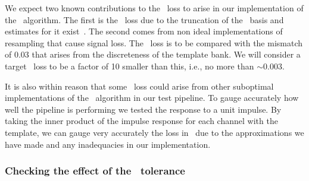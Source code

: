 We expect two known contributions to the \SNR\ loss to arise in our
implementation of the \lloid\ algorithm.  The first is the \SNR\ loss due to
the truncation of the \SVD\ basis and estimates for it
exist~\cite{Cannon:2010p10398}.  The second comes from non ideal
implementations of resampling that cause signal loss.  The \SNR\ loss is to be
compared with the mismatch of 0.03 that arises from the discreteness of the
template bank.  We will consider a target \SNR\ loss to be a factor of 10
smaller than this, i.e., no more than $\sim$0.003.

It is also within reason that some \SNR\ loss could arise from other suboptimal
implementations of the \lloid\ algorithm in our test pipeline.  To gauge
accurately how well the pipeline is performing we tested the response to a
unit impulse.  By taking the inner product of the impulse response for each channel
with the template, we can gauge very accurately the loss in
\SNR\ due to the approximations we have made and any inadequacies in
our implementation.

\subsubsection{Checking the effect of the \SVD\ tolerance}

